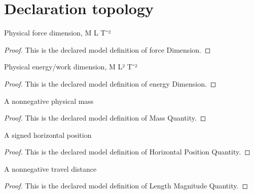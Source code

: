 \section{Declaration topology}
\begin{definition}
  \label{def:physics:phyx-mini-0798:phyxminiproblems-problemphyxmini0798-forcedimension}
  Physical force dimension, M L T⁻²
\end{definition}
\begin{proof}
  This is the declared model definition of force Dimension.
\end{proof}
\begin{definition}
  \label{def:physics:phyx-mini-0798:phyxminiproblems-problemphyxmini0798-energydimension}
  Physical energy/work dimension, M L² T⁻²
\end{definition}
\begin{proof}
  This is the declared model definition of energy Dimension.
\end{proof}
\begin{definition}
  \label{def:physics:phyx-mini-0798:phyxminiproblems-problemphyxmini0798-massquantity}
  A nonnegative physical mass
\end{definition}
\begin{proof}
  This is the declared model definition of Mass Quantity.
\end{proof}
\begin{definition}
  \label{def:physics:phyx-mini-0798:phyxminiproblems-problemphyxmini0798-horizontalpositionquantity}
  A signed horizontal position
\end{definition}
\begin{proof}
  This is the declared model definition of Horizontal Position Quantity.
\end{proof}
\begin{definition}
  \label{def:physics:phyx-mini-0798:phyxminiproblems-problemphyxmini0798-lengthmagnitudequantity}
  A nonnegative travel distance
\end{definition}
\begin{proof}
  This is the declared model definition of Length Magnitude Quantity.
\end{proof}
